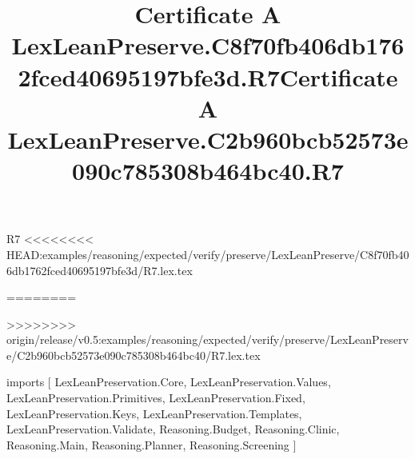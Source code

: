 \begin{lexlean}{R7}
<<<<<<<< HEAD:examples/reasoning/expected/verify/preserve/LexLeanPreserve/C8f70fb406db1762fced40695197bfe3d/R7.lex.tex
\title{Certificate A LexLeanPreserve.C8f70fb406db1762fced40695197bfe3d.R7}
========
\title{Certificate A LexLeanPreserve.C2b960bcb52573e090c785308b464bc40.R7}
>>>>>>>> origin/release/v0.5:examples/reasoning/expected/verify/preserve/LexLeanPreserve/C2b960bcb52573e090c785308b464bc40/R7.lex.tex
\begin{coremodule}
imports [
  LexLeanPreservation.Core,
  LexLeanPreservation.Values,
  LexLeanPreservation.Primitives,
  LexLeanPreservation.Fixed,
  LexLeanPreservation.Keys,
  LexLeanPreservation.Templates,
  LexLeanPreservation.Validate,
  Reasoning.Budget,
  Reasoning.Clinic,
  Reasoning.Main,
  Reasoning.Planner,
  Reasoning.Screening
]


\end{coremodule}
\end{lexlean}
